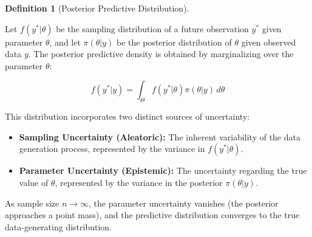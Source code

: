 \documentclass[
  letterpaper,
  DIV=11,
  numbers=noendperiod]{scrreprt}
\providecommand{\tightlist}{%
  \setlength{\itemsep}{0pt}\setlength{\parskip}{0pt}}
\renewcommand{\[}{\begin{equation}}
\renewcommand{\]}{\end{equation}}
\theoremstyle{definition}
\newtheorem{definition}{Definition}[chapter]
\theoremstyle{plain}
\theoremstyle{plain}
\theoremstyle{plain}
\theoremstyle{definition}
\theoremstyle{plain}
\theoremstyle{remark}
\begin{document}
\begin{definition}[Posterior Predictive
Distribution]\protect\hypertarget{def-posterior-predictive}{}\label{def-posterior-predictive}

Let \(f(y^*|\theta)\) be the sampling distribution of a future
observation \(y^*\) given parameter \(\theta\), and let
\(\pi(\theta|y)\) be the posterior distribution of \(\theta\) given
observed data \(y\). The posterior predictive density is obtained by
marginalizing over the parameter \(\theta\):

\[
f(y^*|y) = \int_\Theta f(y^*|\theta) \pi(\theta|y) \, d\theta
\]

\end{definition}

This distribution incorporates two distinct sources of uncertainty:

\begin{itemize}
\tightlist
\item
  \textbf{Sampling Uncertainty (Aleatoric):} The inherent variability of
  the data generation process, represented by the variance in
  \(f(y^*|\theta)\).
\item
  \textbf{Parameter Uncertainty (Epistemic):} The uncertainty regarding
  the true value of \(\theta\), represented by the variance in the
  posterior \(\pi(\theta|y)\).
\end{itemize}

As sample size \(n \to \infty\), the parameter uncertainty vanishes (the
posterior approaches a point mass), and the predictive distribution
converges to the true data-generating distribution.
\end{document}
